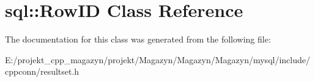 \hypertarget{classsql_1_1_row_i_d}{}\section{sql\+:\+:Row\+ID Class Reference}
\label{classsql_1_1_row_i_d}


The documentation for this class was generated from the following file\+:\begin{DoxyCompactItemize}
\item 
E\+:/projekt\+\_\+cpp\+\_\+magazyn/projekt/\+Magazyn/\+Magazyn/\+Magazyn/mysql/include/cppconn/resultset.\+h\end{DoxyCompactItemize}
